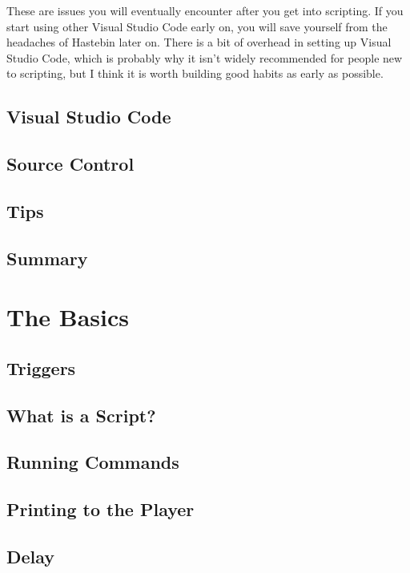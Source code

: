 \documentclass[oneside]{book}
\begin{document}
These are issues you will eventually encounter after you get into scripting. If you start using other Visual Studio Code early on, you will save yourself from the headaches of Hastebin later on. There is a bit of overhead in setting up Visual Studio Code, which is probably why it isn't widely recommended for people new to scripting, but I think it is worth building good habits as early as possible.

\section{Visual Studio Code}
\blindtext

\section{Source Control}
\blindtext

\section{Tips}
\blindtext

\section{Summary}
\blindtext

\chapter{The Basics}

\section{Triggers} \label{sec:triggers}
\blindtext

\section{What is a Script?}
\blindtext

\section{Running Commands}
\blindtext

\section{Printing to the Player}
\blindtext

\section{Delay}
\blindtext
\end{document}
